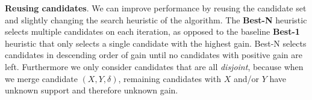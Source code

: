 \documentclass{llncs}
\begin{document}

\smallskip \noindent \textbf{Reusing candidates}.  We can improve performance by reusing the candidate set and slightly changing the search heuristic of the algorithm. The \textbf{Best-N} heuristic selects multiple candidates on each iteration, as opposed to the baseline \textbf{Best-1} heuristic that only selects a single candidate with the highest gain. Best-N selects candidates in descending order of gain until no candidates with positive gain are left. Furthermore we only consider candidates that are all \emph{disjoint}, because when we merge candidate $(X,Y,\delta)$, remaining candidates with $X$ and/or $Y$ have unknown support and therefore unknown gain.%





\end{document}
